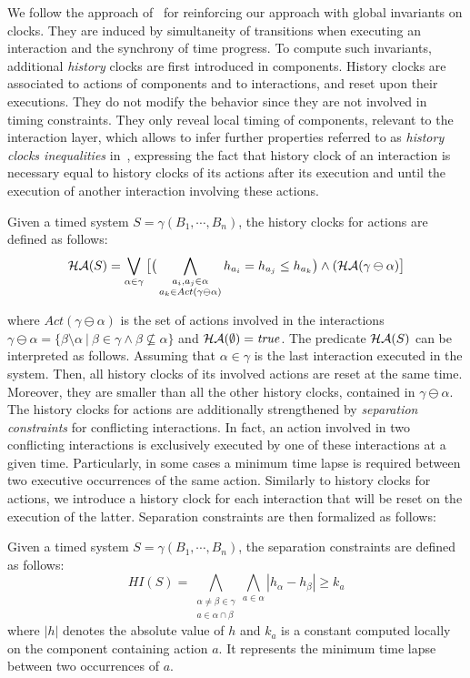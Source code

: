 We follow the approach of~\cite{hs} for reinforcing our approach with global invariants on clocks.
They are induced by simultaneity of transitions when executing an 
interaction and the synchrony of time progress. To compute such invariants, additional 
\emph{history} clocks are first introduced in components. History clocks are associated to 
actions of components and to interactions, and reset upon their executions.
They do not modify the behavior since they are not involved in timing constraints.
They only reveal local timing of components, relevant to the interaction layer, which 
allows to infer further properties referred to as \emph{history clocks inequalities} 
in~\cite{hs}, expressing the fact that history clock of an interaction is necessary 
equal to history clocks of its actions after its execution and until the execution of another 
interaction involving these actions.

\begin{definition}
Given a timed system $S=\gamma(B_1,\cdots,B_n)$, the history clocks for actions are defined
as follows:
  $$\mathcal{HA}(S)=\bigvee_{\alpha\in\gamma}\big[\big(\bigwedge_{\substack{a_i,a_j\in\alpha\\
  a_k\in Act(\gamma\ominus\alpha)}}h_{a_i}=h_{a_j}\le h_{a_k}\big)\wedge(\mathcal{HA}(\gamma\ominus
  \alpha)\big]$$
\end{definition}
where $Act(\gamma\ominus\alpha)$ is the set of actions involved in the interactions
$\gamma\ominus\alpha=\{\beta\setminus\alpha \ | \ \beta\in\gamma\wedge\beta\nsubseteq\alpha\}$
and $\mathcal{HA}(\emptyset)=\textnormal{\textit{true}}$.
The predicate $\mathcal{HA}(S)$ can be interpreted as follows. Assuming that $\alpha\in\gamma$
is the last interaction executed in the system. Then, all history clocks of its involved
actions are reset at the same time. Moreover, they are smaller than all the other history
clocks, contained in $\gamma\ominus\alpha$.
The history clocks for actions are additionally strengthened by \emph{separation constraints}
for conflicting interactions. In fact, an action involved in two conflicting interactions
is exclusively executed by one of these interactions at a given time. Particularly,
in some cases a minimum time lapse is required between two executive occurrences of
the same action. Similarly to history clocks for actions, we introduce a history clock for
each interaction that will be reset on the execution of the latter.
Separation constraints are then formalized as follows:

\begin{definition}
Given a timed system $S=\gamma(B_1,\cdots,B_n)$, the separation constraints are defined
as follows:
  \begin{displaymath}
  HI(S)=\bigwedge_{\substack{\alpha\neq\beta\in\gamma\\a\in\alpha\cap\beta}}
  \bigwedge_{a\in\alpha} |h_{\alpha}-h_{\beta}|\ge k_a
  \end{displaymath}
    where $|h|$ denotes the absolute value of $h$ and $k_a$ is a constant computed locally
on the component containing action $a$. It represents the minimum time lapse between
two occurrences of $a$.
\end{definition}

